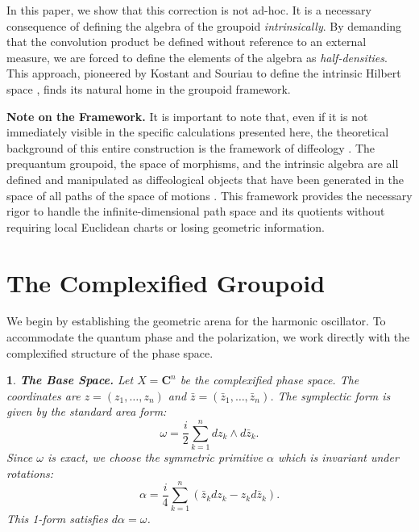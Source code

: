 \documentclass[11pt,reqno,letterpaper,twoside]{amsart}
\theoremstyle{articlestyle}
\newtheorem{article}{}
\theoremstyle{plain}
\theoremstyle{definition}
\def\artlabel[#1]{\textbf{#1.}}
\newcommand{\CC}{\mathbf{C}}
\newcommand{\0}{\hat{0}}
\newcommand{\1}{\hat{1}}
\begin{document}
  In this paper,
  we show that this correction is not ad-hoc.
  It is a necessary consequence of defining the algebra of the groupoid \emph{intrinsically}.
  By demanding that the convolution product be defined without reference to an external measure,
  we are forced to define the elements of the algebra as \emph{half-densities}.
  This approach,
  pioneered by Kostant and Souriau to define the intrinsic Hilbert space \cite{GS77},
  finds its natural home in the groupoid framework.
  
  \smallskip
  \textbf{Note on the Framework.}
  It is important to note that,
  even if it is not immediately visible in the specific calculations presented here,
  the theoretical background of this entire construction is the framework of diffeology \cite{PIZ13, PIZ22}.
  The prequantum groupoid,
  the space of morphisms,
  and the intrinsic algebra are all defined and manipulated as diffeological objects
  that have been generated in the space of all paths of the space of motions \cite{PIZ25a, PIZ25b}.
  This framework provides the necessary rigor to handle the infinite-dimensional path space and its quotients
  without requiring local Euclidean charts or losing geometric information.
  
  
  \section{\textbf{The Complexified Groupoid}}
  \label{sec:ComplexifiedGroupoid}
  
  We begin by establishing the geometric arena for the harmonic oscillator.
  To accommodate the quantum phase and the polarization,
  we work directly with the complexified structure of the phase space.
  
  \begin{article}\artlabel[The Base Space]
    Let $X = \CC^n$ be the complexified phase space.
    The coordinates are $z = (z_1, \dots, z_n)$ and $\bar{z} = (\bar{z}_1, \dots, \bar{z}_n)$.
    The symplectic form is given by the standard area form:
    $$
      \omega = \frac{i}{2} \sum_{k=1}^n dz_k \wedge d\bar{z}_k.
      $$
    Since $\omega$ is exact,
    we choose the symmetric primitive $\alpha$ which is invariant under rotations:
    $$
      \alpha = \frac{i}{4} \sum_{k=1}^n (\bar{z}_k dz_k - z_k d\bar{z}_k).
      $$
    This 1-form satisfies $d\alpha = \omega$.
  \end{article}
  
\end{document}
